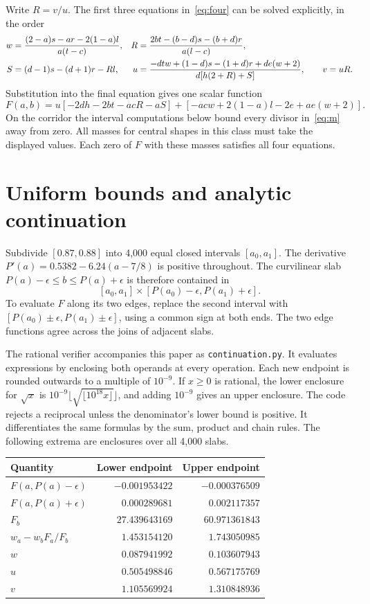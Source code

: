 \documentclass[10pt]{article}
\begin{document}
Write $R=v/u$. The first three equations in~\eqref{eq:four} can be solved explicitly, in the order
\begin{align}
w&=\frac{(2-a)s-ar-2(1-a)l}{a(t-c)},&
R&=\frac{2bt-(b-d)s-(b+d)r}{a(l-c)},\notag\\
S&=(d-1)s-(d+1)r-Rl,&
u&=\frac{-dtw+(1-d)s-(1+d)r+de(w+2)}{d[h(2+R)+S]},\qquad v=uR.\label{eq:m}
\end{align}
Substitution into the final equation gives one scalar function
\[
F(a,b)=u[-2dh-2bt-acR-aS]+[-acw+2(1-a)l-2e+ae(w+2)].
\]
On the corridor the interval computations below bound every divisor in~\eqref{eq:m} away from zero. All masses for central shapes in this class must take the displayed values. Each zero of $F$ with these masses satisfies all four equations.

\section{Uniform bounds and analytic continuation}
Subdivide $[0.87,0.88]$ into 4,000 equal closed intervals $[a_0,a_1]$. The derivative $P'(a)=0.5382-6.24(a-7/8)$ is positive throughout. The curvilinear slab $P(a)-\epsilon\le b\le P(a)+\epsilon$ is therefore contained in
\[
[a_0,a_1]\times[P(a_0)-\epsilon,P(a_1)+\epsilon].
\]
To evaluate $F$ along its two edges, replace the second interval with $[P(a_0)\pm\epsilon,P(a_1)\pm\epsilon]$, using a common sign at both ends. The two edge functions agree across the joins of adjacent slabs.

The rational verifier accompanies this paper as \texttt{continuation.py}. It evaluates expressions by enclosing both operands at every operation. Each new endpoint is rounded outwards to a multiple of $10^{-9}$. If $x\ge0$ is rational, the lower enclosure for $\sqrt{x}$ is $10^{-9}\lfloor\sqrt{\lfloor10^{18}x\rfloor}\rfloor$, and adding $10^{-9}$ gives an upper enclosure. The code rejects a reciprocal unless the denominator's lower bound is positive. It differentiates the same formulas by the sum, product and chain rules. The following extrema are enclosures over all 4,000 slabs.
\begin{center}
\begin{tabular}{lrr}
\toprule
Quantity & Lower endpoint & Upper endpoint\\
\midrule
$F(a,P(a)-\epsilon)$ & $-0.001953422$ & $-0.000376509$\\
$F(a,P(a)+\epsilon)$ & $0.000289681$ & $0.002117357$\\
$F_b$ & $27.439643169$ & $60.971361843$\\
$w_a-w_b F_a/F_b$ & $1.453154120$ & $1.743050985$\\
$w$ & $0.087941992$ & $0.103607943$\\
$u$ & $0.505498846$ & $0.567175769$\\
$v$ & $1.105569924$ & $1.310848936$\\
\bottomrule
\end{tabular}
\end{center}
\end{document}
